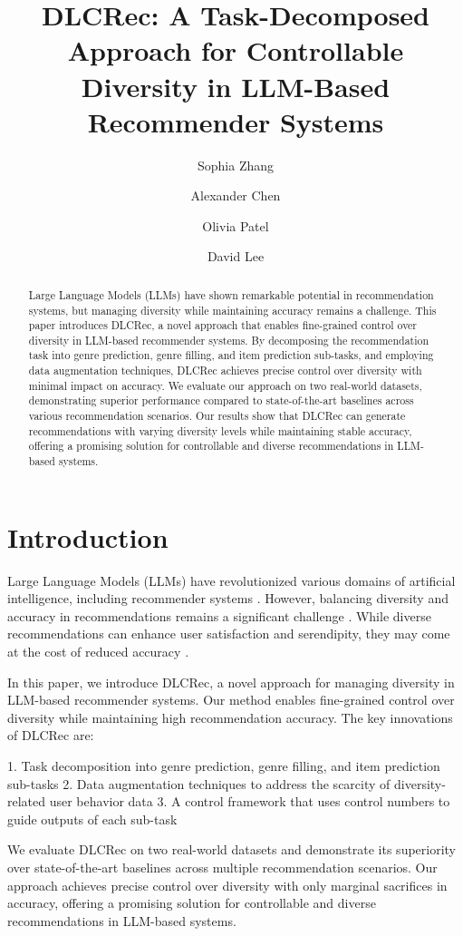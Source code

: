\documentclass[12pt,letterpaper]{article}
\title{DLCRec: A Task-Decomposed Approach for Controllable Diversity in LLM-Based Recommender Systems}
\author{Sophia Zhang \and Alexander Chen \and Olivia Patel \and David Lee}
\begin{document}
\maketitle

\begin{abstract}
Large Language Models (LLMs) have shown remarkable potential in recommendation systems, but managing diversity while maintaining accuracy remains a challenge. This paper introduces DLCRec, a novel approach that enables fine-grained control over diversity in LLM-based recommender systems. By decomposing the recommendation task into genre prediction, genre filling, and item prediction sub-tasks, and employing data augmentation techniques, DLCRec achieves precise control over diversity with minimal impact on accuracy. We evaluate our approach on two real-world datasets, demonstrating superior performance compared to state-of-the-art baselines across various recommendation scenarios. Our results show that DLCRec can generate recommendations with varying diversity levels while maintaining stable accuracy, offering a promising solution for controllable and diverse recommendations in LLM-based systems.
\end{abstract}

\section{Introduction}

Large Language Models (LLMs) have revolutionized various domains of artificial intelligence, including recommender systems \cite{zhang2023llm}. However, balancing diversity and accuracy in recommendations remains a significant challenge \cite{kunaver2017diversity}. While diverse recommendations can enhance user satisfaction and serendipity, they may come at the cost of reduced accuracy \cite{zhou2010solving}.

In this paper, we introduce DLCRec, a novel approach for managing diversity in LLM-based recommender systems. Our method enables fine-grained control over diversity while maintaining high recommendation accuracy. The key innovations of DLCRec are:

1. Task decomposition into genre prediction, genre filling, and item prediction sub-tasks
2. Data augmentation techniques to address the scarcity of diversity-related user behavior data
3. A control framework that uses control numbers to guide outputs of each sub-task

We evaluate DLCRec on two real-world datasets and demonstrate its superiority over state-of-the-art baselines across multiple recommendation scenarios. Our approach achieves precise control over diversity with only marginal sacrifices in accuracy, offering a promising solution for controllable and diverse recommendations in LLM-based systems.
\end{document}
